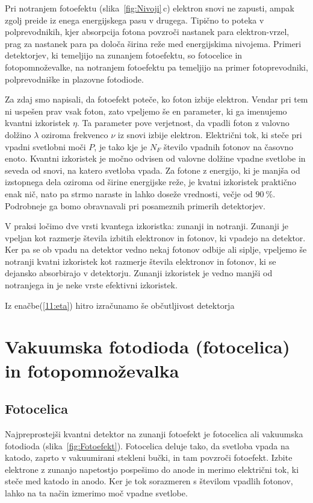 Pri notranjem fotoefektu (slika~\ref{fig:Nivoji}\,c) elektron snovi ne zapusti, ampak zgolj preide iz enega 
energijskega pasu v drugega. Tipično to poteka v polprevodnikih, kjer absorpcija fotona 
povzroči nastanek para elektron-vrzel, prag za nastanek para pa določa širina reže med 
energijskima nivojema. Primeri detektorjev, ki temeljijo na zunanjem fotoefektu, so 
fotocelice in fotopomnoževalke, na notranjem fotoefektu pa temeljijo na primer
fotoprevodniki, polprevodniške in plazovne fotodiode.

Za zdaj smo napisali, da fotoefekt poteče, ko foton izbije elektron. Vendar pri tem ni 
uspešen prav vsak foton, zato vpeljemo še en parameter, ki ga imenujemo kvantni izkoristek $\eta$.
Ta parameter pove verjetnost, da vpadli foton z valovno dolžino $\lambda$ oziroma frekvenco $\nu$ iz 
snovi izbije elektron. Električni tok, ki steče pri vpadni svetlobni moči $P$, je tako
kje je $N_F$ število vpadnih fotonov na časovno enoto.
Kvantni izkoristek je močno odvisen od valovne dolžine vpadne svetlobe in seveda
od snovi, na katero svetloba vpada. Za fotone z energijo, ki je manjša od izstopnega 
dela oziroma od širine energijske reže, je kvatni izkoristek praktično enak nič, 
nato pa strmo naraste in lahko doseže vrednosti, večje od $90~\%$. Podrobneje ga bomo 
obravnavali pri posameznih primerih detektorjev.

\begin{remark}
V praksi ločimo dve vrsti kvantega izkoristka: zunanji in notranji. Zunanji je vpeljan kot 
razmerje števila izbitih elektronov in fotonov, ki vpadejo na detektor. Ker pa se 
ob vpadu na detektor vedno nekaj fotonov odbije ali siplje, vpeljemo še notranji kvatni 
izkoristek kot razmerje števila elektronov in fotonov, ki se dejansko absorbirajo v detektorju.
Zunanji izkoristek je vedno manjši od notranjega in je neke vrste efektivni izkoristek.
\end{remark}

Iz enačbe(\ref{11:eta}) hitro izračunamo še občutljivost detektorja 

\section{Vakuumska fotodioda (fotocelica) in fotopomnoževalka}
\subsection*{Fotocelica}
Najpreprostejši kvantni detektor na zunanji fotoefekt je fotocelica ali vakuumska fotodioda
(slika~\ref{fig:Fotoefekt}). Fotocelica deluje tako, da svetloba vpada na katodo, 
zaprto v vakuumirani stekleni bučki, in tam povzroči fotoefekt. Izbite elektrone 
z zunanjo napetostjo pospešimo do anode in merimo električni tok, ki steče med 
katodo in anodo. Ker je tok sorazmeren s številom vpadlih fotonov, lahko na ta 
način izmerimo moč vpadne svetlobe.

